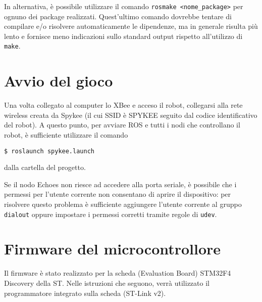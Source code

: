 \begin{nota}
In alternativa, è possibile utilizzare il comando \verb|rosmake <nome_package>| per ognuno dei package realizzati. Quest'ultimo comando dovrebbe tentare di compilare e/o risolvere automaticamente le dipendenze, ma in generale risulta più lento e fornisce meno indicazioni sullo standard output rispetto all'utilizzo di \verb|make|.
\end{nota}

\section{Avvio del gioco} Una volta collegato al computer lo XBee e acceso il robot, collegarsi alla rete wireless creata da Spykee (il cui SSID è SPYKEE seguito dal codice identificativo del robot). A questo punto, per avviare ROS e tutti i nodi che controllano il robot, è sufficiente utilizzare il comando
\begin{verbatim}
$ roslaunch spykee.launch
\end{verbatim}
dalla cartella del progetto.

\begin{nota}
Se il nodo Echoes non riesce ad accedere alla porta seriale, è possibile che i permessi per l'utente corrente non consentano di aprire il dispositivo: per risolvere questo problema è sufficiente aggiungere l'utente corrente al gruppo \verb|dialout| oppure impostare i permessi corretti tramite regole di \verb|udev|.
\end{nota}

\section{Firmware del microcontrollore}

Il firmware è stato realizzato per la scheda (Evaluation Board) STM32F4 Discovery della ST. Nelle istruzioni che seguono, verrà utilizzato il programmatore integrato sulla scheda (ST-Link v2).

